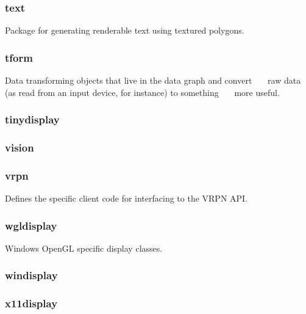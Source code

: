 \documentclass[a4paper]{article}
\begin{document}
\clearpage\subsubsection[text]{text}
\hypertarget{RefHeading22351167907073}{}{\color{black}
Package for generating renderable text using textured polygons.}

\clearpage\subsubsection[tform]{tform}
\hypertarget{RefHeading22371167907073}{}{\color{black}
Data transforming objects that live in the data graph and convert\newline
 \ \ \ raw data (as read from an input device, for instance) to something\newline
 \ \ \ more useful.}

\clearpage\subsubsection[tinydisplay]{tinydisplay}
\hypertarget{RefHeading22391167907073}{}\subsubsection{}
\clearpage\subsubsection[vision]{vision}
\hypertarget{RefHeading22411167907073}{}\subsubsection{}
\clearpage\subsubsection[vrpn]{vrpn}
\hypertarget{RefHeading22431167907073}{}{\color{black}
Defines the specific client code for interfacing to the VRPN API.}

\clearpage\subsubsection[wgldisplay]{wgldisplay}
\hypertarget{RefHeading22451167907073}{}{\color{black}
Windows OpenGL specific display classes.}

\clearpage\subsubsection[windisplay]{windisplay}
\hypertarget{RefHeading22471167907073}{}\subsubsection{}
\clearpage\subsubsection[x11display]{x11display}
\hypertarget{RefHeading22491167907073}{}\clearpage
\bigskip
\end{document}
